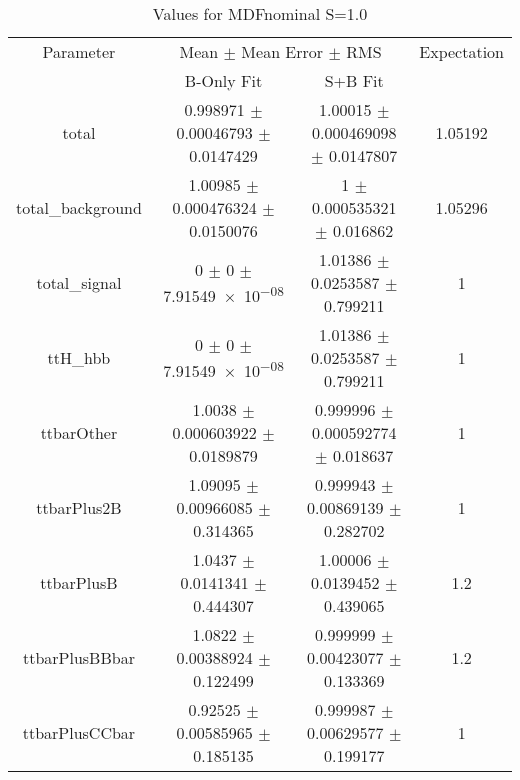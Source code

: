 \begin{table}
\centering
\caption{Values for MDFnominal S=1.0}
\begin{tabular}{cccc}
\toprule
Parameter & \multicolumn{2}{c}{Mean $\pm$ Mean Error $\pm$ RMS} & Expectation\\
 & B-Only Fit & S+B Fit & \\
\midrule
total & \num{0.998971} $\pm$ \num{0.00046793} $\pm$ \num{0.0147429} & \num{1.00015} $\pm$ \num{0.000469098} $\pm$ \num{0.0147807} & \num{1.05192}\\
total\_background & \num{1.00985} $\pm$ \num{0.000476324} $\pm$ \num{0.0150076} & \num{1} $\pm$ \num{0.000535321} $\pm$ \num{0.016862} & \num{1.05296}\\
total\_signal & \num{0} $\pm$ \num{0} $\pm$ \num{7.91549e-08} & \num{1.01386} $\pm$ \num{0.0253587} $\pm$ \num{0.799211} & \num{1}\\
ttH\_hbb & \num{0} $\pm$ \num{0} $\pm$ \num{7.91549e-08} & \num{1.01386} $\pm$ \num{0.0253587} $\pm$ \num{0.799211} & \num{1}\\
ttbarOther & \num{1.0038} $\pm$ \num{0.000603922} $\pm$ \num{0.0189879} & \num{0.999996} $\pm$ \num{0.000592774} $\pm$ \num{0.018637} & \num{1}\\
ttbarPlus2B & \num{1.09095} $\pm$ \num{0.00966085} $\pm$ \num{0.314365} & \num{0.999943} $\pm$ \num{0.00869139} $\pm$ \num{0.282702} & \num{1}\\
ttbarPlusB & \num{1.0437} $\pm$ \num{0.0141341} $\pm$ \num{0.444307} & \num{1.00006} $\pm$ \num{0.0139452} $\pm$ \num{0.439065} & \num{1.2}\\
ttbarPlusBBbar & \num{1.0822} $\pm$ \num{0.00388924} $\pm$ \num{0.122499} & \num{0.999999} $\pm$ \num{0.00423077} $\pm$ \num{0.133369} & \num{1.2}\\
ttbarPlusCCbar & \num{0.92525} $\pm$ \num{0.00585965} $\pm$ \num{0.185135} & \num{0.999987} $\pm$ \num{0.00629577} $\pm$ \num{0.199177} & \num{1}\\
\bottomrule
\end{tabular}
\end{table}